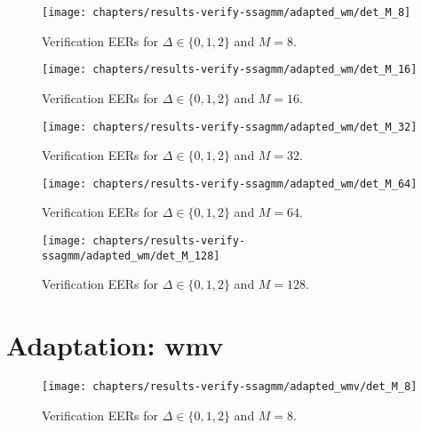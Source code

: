 

\begin{figure}[ht]
	\centering
	\texttt{[image: chapters/results-verify-ssagmm/adapted\_wm/det\_M\_8]}
	\caption{Verification EERs for $\Delta \in \{0, 1, 2\}$ and $M = 8$.}
	\label{fig:results-verify-ssagmm_M_8}
\end{figure}

\newpage


\begin{figure}[ht]
	\centering
	\texttt{[image: chapters/results-verify-ssagmm/adapted\_wm/det\_M\_16]}
	\caption{Verification EERs for $\Delta \in \{0, 1, 2\}$ and $M = 16$.}
	\label{fig:results-verify-ssagmm_M_16}
\end{figure}

\newpage


\begin{figure}[ht]
	\centering
	\texttt{[image: chapters/results-verify-ssagmm/adapted\_wm/det\_M\_32]}
	\caption{Verification EERs for $\Delta \in \{0, 1, 2\}$ and $M = 32$.}
	\label{fig:results-verify-ssagmm_M_32}
\end{figure}

\newpage


\begin{figure}[ht]
	\centering
	\texttt{[image: chapters/results-verify-ssagmm/adapted\_wm/det\_M\_64]}
	\caption{Verification EERs for $\Delta \in \{0, 1, 2\}$ and $M = 64$.}
	\label{fig:results-verify-ssagmm_M_64}
\end{figure}

\newpage


\begin{figure}[ht]
	\centering
	\texttt{[image: chapters/results-verify-ssagmm/adapted\_wm/det\_M\_128]}
	\caption{Verification EERs for $\Delta \in \{0, 1, 2\}$ and $M = 128$.}
	\label{fig:results-verify-ssagmm_M_128}
\end{figure}

\newpage
\section{Adaptation: wmv}



\begin{figure}[ht]
	\centering
	\texttt{[image: chapters/results-verify-ssagmm/adapted\_wmv/det\_M\_8]}
	\caption{Verification EERs for $\Delta \in \{0, 1, 2\}$ and $M = 8$.}
	\label{fig:results-verify-ssagmm_M_8}
\end{figure}

